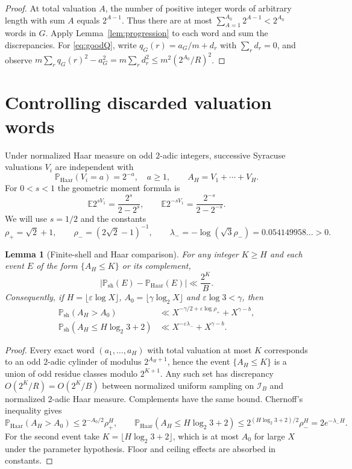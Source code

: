 \documentclass[11pt]{amsart}
\newtheorem{lemma}{Lemma}
\theoremstyle{remark}\newtheorem{remark}{Remark}
\newcommand{\Psh}{\mathbb P_{\mathrm{sh}}}
\newcommand{\Ph}{\mathbb P_{\mathrm{Haar}}}
\begin{document}
\begin{proof}
At total valuation $A$, the number of positive integer words of arbitrary length with sum $A$ equals $2^{A-1}$.  Thus there are at most $\sum_{A=1}^{A_0}2^{A-1}<2^{A_0}$ words in $G$. Apply Lemma~\ref{lem:progression} to each word and sum the discrepancies.  For \eqref{eq:goodQ}, write $q_G(r)=a_G/m+d_r$ with $\sum_r d_r=0$, and observe $m\sum_rq_G(r)^2-a_G^2=m\sum_rd_r^2\le m^2(2^{A_0}/R)^2$.
\end{proof}

\section{Controlling discarded valuation words}
Under normalized Haar measure on odd $2$-adic integers, successive Syracuse valuations $V_i$ are independent with
\[ \Ph(V_i=a)=2^{-a},\quad a\ge1,\qquad A_H=V_1+\cdots+V_H.
\]
For $0<s<1$ the geometric moment formula is
\[ \mathbb E 2^{sV_1}=\frac{2^s}{2-2^s},\qquad
\mathbb E 2^{-sV_1}=\frac{2^{-s}}{2-2^{-s}}.\]
We will use $s=1/2$ and the constants
\[
 \rho_+=\sqrt2+1,\qquad \rho_-=(2\sqrt2-1)^{-1},\qquad
 \lambda_-=-\log(\sqrt3\rho_-)=0.054149958\ldots>0.
\]

\begin{lemma}[Finite-shell and Haar comparison]\label{lem:haar}
For any integer $K\ge H$ and each event $E$ of the form $\{A_H\le K\}$ or its complement,
\[
 \left|\Psh(E)-\Ph(E)\right|\ll \frac{2^K}{B}.
\]
Consequently, if $H=\lfloor\varepsilon\log X\rfloor$, $A_0=\lfloor\gamma\log_2 X\rfloor$ and $\varepsilon\log3<\gamma$, then
\begin{align}
 \Psh(A_H>A_0)&\ll X^{-\gamma/2+\varepsilon\log\rho_+}+X^{\gamma-b},\label{eq:largeA}\\
 \Psh\left(A_H\le H\log_2 3+2\right)&\ll X^{-\varepsilon\lambda_-}+X^{\gamma-b}.\label{eq:smallA}
\end{align}
\end{lemma}
\begin{proof}
Every exact word $(a_1,\ldots,a_H)$ with total valuation at most $K$ corresponds to an odd $2$-adic cylinder of modulus $2^{A_H+1}$, hence the event $\{A_H\le K\}$ is a union of odd residue classes modulo $2^{K+1}$.  Any such set has discrepancy $O(2^K/R)=O(2^K/B)$ between normalized uniform sampling on $\mathcal I_B$ and normalized $2$-adic Haar measure.  Complements have the same bound.  Chernoff's inequality gives
\[
 \Ph(A_H>A_0)\le2^{-A_0/2}\rho_+^H,
 \qquad \Ph(A_H\le H\log_2 3+2)
 \le2^{(H\log_2 3+2)/2}\rho_-^H=2e^{-\lambda_-H}.
\]
For the second event take $K=\lfloor H\log_2 3+2\rfloor$, which is at most $A_0$ for large $X$ under the parameter hypothesis.  Floor and ceiling effects are absorbed in constants.
\end{proof}
\end{document}
